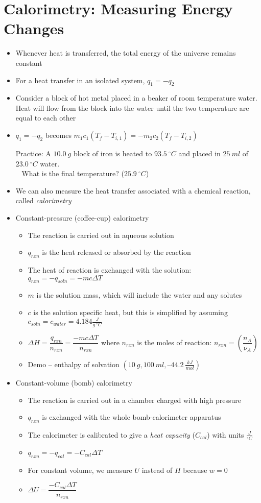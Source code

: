 \documentclass[12pt, openany, letterpaper]{memoir}
\begin{document}
\section{Calorimetry: Measuring Energy Changes}
\begin{itemize}
	\item Whenever heat is transferred, the total energy of the universe remains constant
	\item For a heat transfer in an isolated system, $q_1=-q_2$
	\item Consider a block of hot metal placed in a beaker of room temperature water. Heat will flow from the block into the water until the two temperature are equal to each other
	\item $q_1=-q_2$ becomes $m_1c_1\left(T_f-T_{i,1}\right)=-m_2c_2\left(T_f-T_{i,2}\right)$
	
	Practice: A $10.0~g$ block of iron is heated to $93.5~^\circ C$ and placed in $25~ml$ of $23.0~^\circ C$ water.\\
	~\hphantom{Practice:} What is the final temperature? ($25.9~^\circ C$)
	\item We can also measure the heat transfer associated with a chemical reaction, called \emph{calorimetry}
	\item Constant-pressure (coffee-cup) calorimetry 
	\begin{itemize}
		\item The reaction is carried out in aqueous solution
		\item $q_{rxn}$ is the heat released or absorbed by the reaction
		\item The heat of reaction is exchanged with the solution: $q_{rxn} = -q_{soln} = -mc\Delta T$
		\item $m$ is the solution mass, which will include the water and any solutes
		\item $c$ is the solution specific heat, but this is simplified by assuming $c_{soln}=c_{water}=4.184\frac{J}{g~^\circ C}$
		\item $\Delta H = \dfrac{q_{rxn}}{n_{rxn}} = \dfrac{-mc\Delta T}{n_{rxn}}$ where $n_{rxn}$ is the moles of reaction: $n_{rxn}=\left(\dfrac{n_A}{\nu_A}\right)$
		\item Demo --  enthalpy of solvation $\left(10~g, 100~ml, –44.2~\frac{kJ}{mol}\right)$
	\end{itemize}
	\item Constant-volume (bomb) calorimetry
	\begin{itemize}
		\item The reaction is carried out in a chamber charged with high pressure 
		\item $q_{rxn}$ is exchanged with the whole bomb-calorimeter apparatus
		\item The calorimeter is calibrated to give a \emph{heat capacity} ($C_{cal}$) with units $\frac{J}{^\circ C}$
		\item $q_{rxn}=-q_{cal}=-C_{cal}\Delta T$
		\item For constant volume, we measure $U$ instead of $H$ because $w=0$
		\item $\Delta U = \dfrac{-C_{cal}\Delta T}{n_{rxn}}$
	\end{itemize}
\end{itemize}
\end{document}
